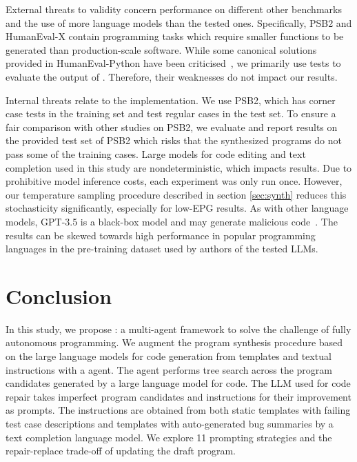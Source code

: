 External threats to validity concern \method{} performance on different other benchmarks and the use of more language models than the tested ones. 
Specifically, PSB2 and HumanEval-X contain programming tasks which require smaller functions to be generated than production-scale software.
While some canonical solutions provided in HumanEval-Python have been criticised~\cite{liuYourCodeGenerated2023}, we primarily use tests to evaluate the output of \method{}. Therefore, their weaknesses do not impact our results.

Internal threats relate to the implementation.
We use PSB2, which has corner case tests in the training set and test regular cases in the test set. 
To ensure a fair comparison with other studies on PSB2, we evaluate and report results on the provided test set of PSB2 which risks that the synthesized programs do not pass some of the training cases. 
Large models for code editing and text completion used in this study are nondeterministic, which impacts results. 
Due to prohibitive model inference costs, each experiment was only run once.
However, our temperature sampling procedure described in section \ref{sec:synth} reduces this stochasticity significantly, especially for low-EPG results.
As with other language models, GPT-3.5 is a black-box model and may generate malicious code~\cite{pearceAsleepKeyboardAssessing2022}. 
The results can be skewed towards high performance in popular programming languages in the pre-training dataset used by authors of the tested LLMs.

\section{Conclusion}
\label{sec:conclusion}
In this study, we propose \method{}: a multi-agent framework to solve the challenge of fully autonomous programming. 
We augment the program synthesis procedure based on the large language models for code generation from templates and textual instructions with a \debug{} agent. 
The \debug{} agent performs tree search across the program candidates generated by a large language model for code.
The LLM used for code repair takes imperfect program candidates and instructions for their improvement as prompts. 
The instructions are obtained from both static templates with failing test case descriptions and templates with auto-generated bug summaries by a text completion language model. 
We explore 11 prompting strategies and the repair-replace trade-off of updating the draft program.

